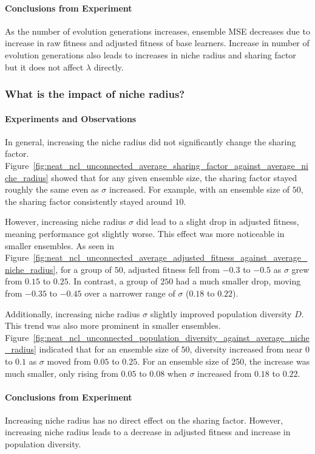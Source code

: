 \documentclass{article}
\begin{document}
\paragraph{Conclusions from Experiment}
As the number of evolution generations increases, ensemble MSE decreases due to increase in raw fitness and adjusted fitness of base learners. Increase in number of evolution generations also leads to increases in niche radius and sharing factor but it does not affect $\lambda$ directly. 


\subsubsection{What is the impact of niche radius? }
\paragraph{Experiments and Observations}
In general, increasing the niche radius did not significantly change the sharing factor. Figure~\ref{fig:neat_ncl_unconnected_average_sharing_factor_against_average_niche_radius} showed that for any given ensemble size, the sharing factor stayed roughly the same even as $\sigma$ increased. For example, with an ensemble size of $50$, the sharing factor consistently stayed around $10$.

However, increasing niche radius $\sigma$ did lead to a slight drop in adjusted fitness, meaning performance got slightly worse. This effect was more noticeable in smaller ensembles. As seen in Figure~\ref{fig:neat_ncl_unconnected_average_adjusted_fitness_against_average_niche_radius}, for a group of $50$, adjusted fitness fell from $-0.3$ to $-0.5$ as $\sigma$ grew from $0.15$ to $0.25$. In contrast, a group of $250$ had a much smaller drop, moving from $-0.35$ to $-0.45$ over a narrower range of $\sigma$ ($0.18$ to $0.22$).

Additionally, increasing niche radius $\sigma$ slightly improved population diversity $D$. This trend was also more prominent in smaller ensembles. Figure~\ref{fig:neat_ncl_unconnected_population_diversity_against_average_niche_radius} indicated that for an ensemble size of $50$, diversity increased from near $0$ to $0.1$ as $\sigma$ moved from $0.05$ to $0.25$. For an ensemble size of $250$, the increase was much smaller, only rising from $0.05$ to $0.08$ when $\sigma$ increased from $0.18$ to $0.22$. 

\paragraph{Conclusions from Experiment}
Increasing niche radius has no direct effect on the sharing factor. However, increasing niche radius leads to a decrease in adjusted fitness and increase in population diversity. 
\end{document}
